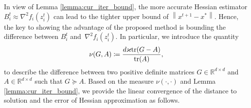 \documentclass[letterpaper]{article} %
\theoremstyle{plain}
\theoremstyle{definition}
\theoremstyle{remark}
\newcommand\norm[1]{\left\lVert#1\right\rVert}
\def\BR{{\mathbb{R}}}
\begin{document}
In view of Lemma \ref{lemma:cur_iter_bound}, the more accurate Hessian estimator $B_i^t\approx \nabla^2 f_i(z_i^t)$ can lead to the tighter upper bound of $\norm{x^{t+1}-x^*}$.
Hence, the key to showing the advantage of the proposed method is bounding the difference between $B_i^t$ and~$\nabla^2 f_i(z_i^t)$.
In particular, we introduce the quantity
\begin{equation}
    \nu(G, A) \coloneqq \frac{d \varkappa {\rm tr}(G-A)}{{\rm tr}(A)},
    \label{nudef}
\end{equation}
to describe the difference between two positive definite matrices $G\in\BR^{d\times d}$ and $A\in\BR^{d\times d}$ such that $G \succeq A$.
Based on the measure $\nu(\cdot,\cdot)$ and Lemma \ref{lemma:cur_iter_bound}, we provide the linear convergence of the distance to solution and the error of Hessian approximation as follows.
\end{document}
